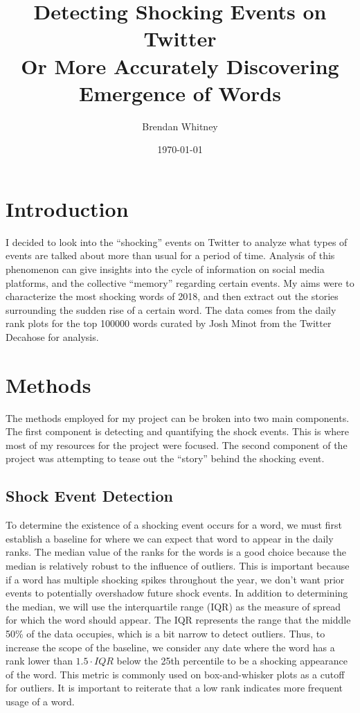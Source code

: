 \documentclass{article}
\begin{document}
\title{Detecting Shocking Events on Twitter\\
Or More Accurately Discovering Emergence of Words}
\author{Brendan Whitney}
\date{\today}
\maketitle

\section{Introduction}
I decided to look into the ``shocking'' events on Twitter to analyze what
types of events are talked about more than usual for a period of time.
Analysis of this phenomenon can give insights into the cycle of information
on social media platforms,
and the collective ``memory'' regarding certain events.
My aims were to characterize the most shocking words of 2018,
and then extract out the stories surrounding the sudden rise of a certain word.
The data comes from the daily rank plots for the top 100000 words
curated by Josh Minot from the Twitter Decahose for analysis.

\section{Methods}
The methods employed for my project can be broken into two main components.
The first component is detecting and quantifying the shock events.
This is where most of my resources for the project were focused.
The second component of the project was attempting to tease out the ``story''
behind the shocking event.

\subsection{Shock Event Detection}
To determine the existence of a shocking event occurs for a word,
we must first establish a baseline for where we can expect that word to appear
in the daily ranks.
The median value of the ranks for the words is a good choice because the median
is relatively robust to the influence of outliers.
This is important because if a word has multiple shocking spikes throughout the
year,
we don't want prior events to potentially overshadow future shock events.
In addition to determining the median,
we will use the interquartile range (IQR) as the measure of spread for
which the word should appear.
The IQR represents the range that the middle 50\% of the data occupies,
which is a bit narrow to detect outliers.
Thus,
to increase the scope of the baseline,
we consider any date where the word has a rank lower than
$1.5\cdot IQR$ below the 25th percentile to be a shocking appearance of the
word.
This metric is commonly used on box-and-whisker plots as a cutoff for outliers.
It is important to reiterate that a low rank indicates more frequent usage of
a word.
\par
\end{document}
